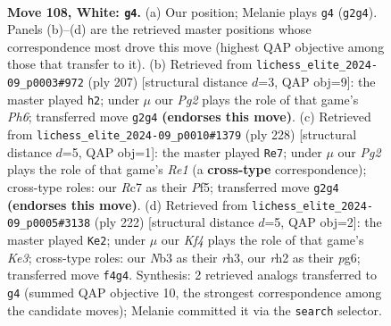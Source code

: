 \documentclass[11pt]{article}
\begin{document}
\clearpage

\begin{figure}[p]\centering
\begin{subfigure}{0.46\textwidth}\centering
\resizebox{\linewidth}{!}{%
\newchessgame
\chessboard[
  setfen={8/2R5/4k3/8/5K2/1N6/6Pr/8 w - - 80 108},
  showmover=false,
  pgfstyle=straightmove, color=movearrow, markmove={g2-g4}
]}
\caption{}
\end{subfigure}\hfill
\begin{subfigure}{0.46\textwidth}\centering
\resizebox{\linewidth}{!}{%
\newchessgame
\chessboard[
  setfen={8/3k4/6r1/7R/8/K6p/8/8 b - - 39 104},
  showmover=false,
  pgfstyle=straightmove, color=movearrow, markmove={h3-h2}
]}
\caption{}
\end{subfigure}
\\[4pt]
\begin{subfigure}{0.46\textwidth}\centering
\resizebox{\linewidth}{!}{%
\newchessgame
\chessboard[
  setfen={8/r4K1k/8/5P2/8/8/8/4R3 w - - 12 115},
  showmover=false,
  pgfstyle=straightmove, color=movearrow, markmove={e1-e7}
]}
\caption{}
\end{subfigure}\hfill
\begin{subfigure}{0.46\textwidth}\centering
\resizebox{\linewidth}{!}{%
\newchessgame
\chessboard[
  setfen={8/3R4/6p1/4k1P1/8/4K2r/8/8 w - - 1 112},
  showmover=false,
  pgfstyle=straightmove, color=movearrow, markmove={e3-e2}
]}
\caption{}
\end{subfigure}
\caption{\textbf{Move 108, White: \texttt{g4}.} (a) Our position; Melanie plays \texttt{g4} (\texttt{g2g4}). Panels (b)--(d) are the retrieved master positions whose correspondence most drove this move (highest QAP objective among those that transfer to it). (b) Retrieved from \texttt{lichess\_elite\_2024-09\_p0003\#972} (ply 207) [structural distance $d$=3, QAP obj=9]: the master played \texttt{h2}; under $\mu$ our \emph{Pg2} plays the role of that game's \emph{Ph6}; transferred move \texttt{g2g4} \textbf{(endorses this move)}. (c) Retrieved from \texttt{lichess\_elite\_2024-09\_p0010\#1379} (ply 228) [structural distance $d$=5, QAP obj=1]: the master played \texttt{Re7}; under $\mu$ our \emph{Pg2} plays the role of that game's \emph{Re1} (a \textbf{cross-type} correspondence); cross-type roles: our \emph{R}c7 as their \emph{P}f5; transferred move \texttt{g2g4} \textbf{(endorses this move)}. (d) Retrieved from \texttt{lichess\_elite\_2024-09\_p0005\#3138} (ply 222) [structural distance $d$=5, QAP obj=2]: the master played \texttt{Ke2}; under $\mu$ our \emph{Kf4} plays the role of that game's \emph{Ke3}; cross-type roles: our \emph{N}b3 as their \emph{r}h3, our \emph{r}h2 as their \emph{p}g6; transferred move \texttt{f4g4}. Synthesis: 2 retrieved analogs transferred to \texttt{g4} (summed QAP objective 10, the strongest correspondence among the candidate moves); Melanie committed it via the \texttt{search} selector.}
\label{fig:thought-m214}
\end{figure}
\end{document}
